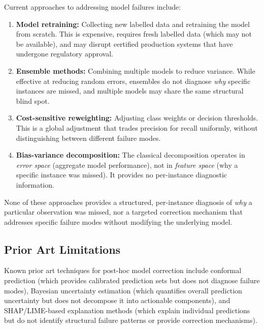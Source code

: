 \documentclass[12pt,a4paper]{article}
\begin{document}
Current approaches to addressing model failures include:

\begin{enumerate}[label=(\alph*)]
\item \textbf{Model retraining:} Collecting new labelled data and 
retraining the model from scratch. This is expensive, requires fresh 
labelled data (which may not be available), and may disrupt certified 
production systems that have undergone regulatory approval.

\item \textbf{Ensemble methods:} Combining multiple models to reduce 
variance. While effective at reducing random errors, ensembles do not 
diagnose \emph{why} specific instances are missed, and multiple models may 
share the same structural blind spot.

\item \textbf{Cost-sensitive reweighting:} Adjusting class weights or 
decision thresholds. This is a global adjustment that trades precision for 
recall uniformly, without distinguishing between different failure modes.

\item \textbf{Bias-variance decomposition:} The classical decomposition 
operates in \emph{error space} (aggregate model performance), not in 
\emph{feature space} (why a specific instance was missed). It provides no 
per-instance diagnostic information.
\end{enumerate}

None of these approaches provides a structured, per-instance diagnosis of 
\textit{why} a particular observation was missed, nor a targeted correction 
mechanism that addresses specific failure modes without modifying the 
underlying model.

\subsection{Prior Art Limitations}

Known prior art techniques for post-hoc model correction include conformal 
prediction (which provides calibrated prediction sets but does not diagnose 
failure modes), Bayesian uncertainty estimation (which quantifies overall 
prediction uncertainty but does not decompose it into actionable components), 
and SHAP/LIME-based explanation methods (which explain individual 
predictions but do not identify structural failure patterns or provide 
correction mechanisms).

\end{document}
